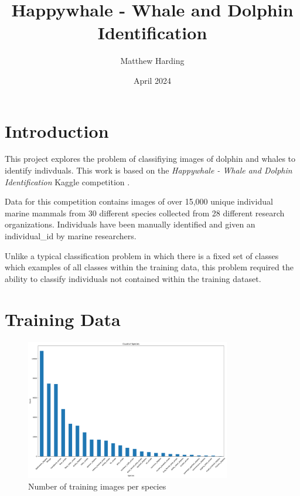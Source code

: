 \documentclass{article}
\title{Happywhale - Whale and Dolphin Identification}
\author{Matthew Harding}
\date{April 2024}
\begin{document}
\maketitle

\section{Introduction}
This project explores the problem of classifiying images of dolphin and whales to identify indivduals. This work 
is based on the \emph{Happywhale - Whale and Dolphin Identification} Kaggle competition \cite{kaggle_comp}.

Data for this competition contains images of over 15,000 unique individual marine mammals from 30 different species collected from 28 different research organizations. 
Individuals have been manually identified and given an individual\_id by marine researchers.

Unlike a typical classification problem in which there is a fixed set of classes which examples of all classes within the training data, this problem required the ability to classify individuals not contained within the training dataset.

\section{Training Data}

\begin{figure}[!htb]
    \centering
    \includegraphics[width=0.8\textwidth]{species_histogram.png}
    \caption{Number of training images per species}
    \label{fig:species_count_histogram}
\end{figure}
\end{document}
